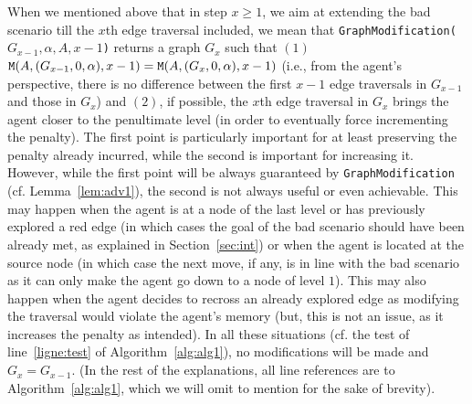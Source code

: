 \documentclass[11pt]{article}
\begin{document}
{When we mentioned above that in step $x\geq1$, we aim at extending the bad scenario till the $x$th edge traversal included, we mean that {\tt GraphModification($G_{x-1},\alpha,A,x-1$)} returns a graph $G_{x}$ such that $(1)$ ${\tt M}(A,(G_{x-1},0,\alpha),x-1)={\tt M}(A,(G_{x},0,\alpha),x-1)$ (i.e., from the agent's perspective, there is no difference between the first $x-1$ edge traversals in $G_{x-1}$ and those in $G_{x}$) and $(2)$, if possible, the $x$th edge traversal in $G_{x}$ brings the agent closer to the penultimate level (in order to eventually force incrementing the penalty). The first point is particularly important for at least preserving the penalty already incurred, while the second is important for increasing it. However, while the first point will be always guaranteed by {\tt GraphModification} (cf. Lemma~\ref{lem:adv1}), the second is not always useful or even achievable. This may happen when the agent is at a node of the last level or has previously explored a red edge (in which cases the goal of the bad scenario should have been already met, as explained in Section~\ref{sec:int}) or when the agent is located at the source node (in which case the next move, if any, is in line with the bad scenario as it can only make the agent go down to a node of level $1$). This may also happen when the agent decides to recross an already explored edge as modifying the traversal would violate the agent's memory (but, this is not an issue, as it increases the penalty as intended). In all these situations (cf. the test of line~\ref{ligne:test} of Algorithm~\ref{alg:alg1}), no modifications will be made and $G_x=G_{x-1}$. (In the rest of the explanations, all line references are to Algorithm~\ref{alg:alg1}, which we will omit to mention for the sake of brevity).



}
\end{document}
